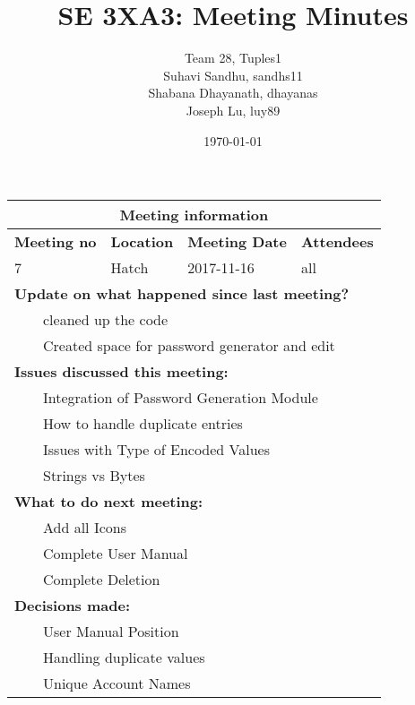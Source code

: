 \documentclass{article}
\title{SE 3XA3: Meeting Minutes}
\author{Team 28, Tuples1
		\\ Suhavi Sandhu, sandhs11
		\\ Shabana Dhayanath, dhayanas
		\\ Joseph Lu, luy89
}
\date{\today}
\newcommand{\tabitem}{~~\llap{\textbullet}~~}
\begin{document}
\begin{tabularx}{\textwidth}{| X || X || X || X |}

    \hline
    \hline
    \multicolumn{4}{|c|}{\textbf{Meeting information}}\\
    \hline
    \hline
        
    \textbf{Meeting no}& \textbf{Location}&\textbf{Meeting Date}&\textbf{Attendees}\\
    
    \hline

    7 & Hatch & 2017-11-16 & all\\
    
    \hline

    \multicolumn{4}{|l|}{\textbf{Update on what happened since last meeting?}}\\

    \multicolumn{4}{|l|}{\tabitem cleaned up the code}\\
    \multicolumn{4}{|l|}{\tabitem Created space for password generator and edit}\\

    \hline

    \multicolumn{4}{|l|}{\textbf{Issues discussed this meeting:}}\\
    
    \multicolumn{4}{|l|}{\tabitem Integration of Password Generation Module}\\
    \multicolumn{4}{|l|}{\tabitem How to handle duplicate entries}\\
    \multicolumn{4}{|l|}{\tabitem Issues with Type of Encoded Values}\\
    \multicolumn{4}{|l|}{\quad\tabitem Strings vs Bytes}\\

    \hline

    \multicolumn{4}{|l|}{\textbf{What to do next meeting:}}\\

    \multicolumn{4}{|l|}{\tabitem Add all Icons}\\
    \multicolumn{4}{|l|}{\tabitem Complete User Manual}\\
    \multicolumn{4}{|l|}{\tabitem Complete Deletion}\\

    \hline

    \multicolumn{4}{|l|}{\textbf{Decisions made:}}\\
    
    \multicolumn{4}{|l|}{\tabitem User Manual Position}\\
    \multicolumn{4}{|l|}{\tabitem Handling duplicate values}\\
    \multicolumn{4}{|l|}{\quad\tabitem Unique Account Names}\\

    \hline


\end{tabularx}
\end{document}
